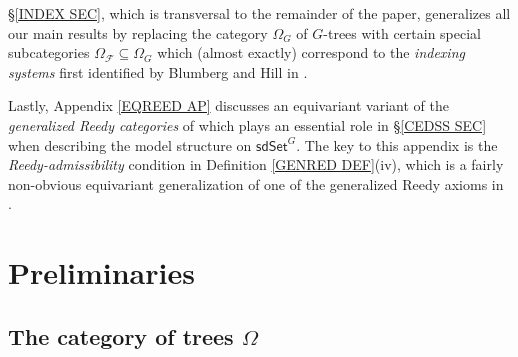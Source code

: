 \documentclass[a4paper,10pt
,draft
]{article}%
\begin{document}
\S \ref{INDEX SEC}, which is transversal to the remainder of the paper, generalizes all our main results by replacing the category $\Omega_G$ of $G$-trees
with certain special subcategories
$\Omega_{\mathcal{F}} \subseteq \Omega_G$
which (almost exactly) correspond to the 
\textit{indexing systems} first identified
by Blumberg and Hill in \cite{BH15}.

Lastly, Appendix \ref{EQREED AP} discusses an equivariant variant of the \textit{generalized Reedy categories}
of \cite{BM11} which plays an essential role in \S \ref{CEDSS SEC}
when describing the model structure on $\mathsf{sdSet}^G$.
The key to this appendix is the \textit{Reedy-admissibility} condition in 
Definition \ref{GENRED DEF}(iv),
which is a fairly non-obvious equivariant generalization of one of the generalized Reedy axioms in \cite{BM11}.



\section{Preliminaries}\label{PREL SEC}

\subsection{The category of trees $\Omega$}
\end{document}
